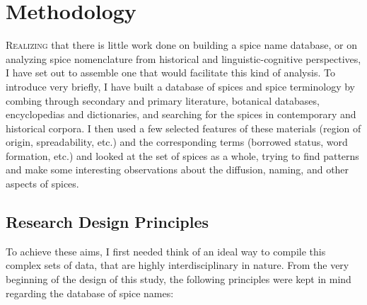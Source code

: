 

\chapter{Methodology}
\label{ch:methodology}


\lettrine[lines=\iniciale]{\textcolor{\accentcolor}{R}}{ealizing} that there is little work done on building a spice name database, or on analyzing spice nomenclature from historical and linguistic-cognitive perspectives, I have set out to assemble one that would facilitate this kind of analysis. 
To introduce very briefly, I have built a database of spices and spice terminology by combing through secondary and primary literature, botanical databases, encyclopedias and dictionaries, and searching for the spices in contemporary and historical corpora. I then used a few selected features of these materials (region of origin, spreadability, etc.) and the corresponding terms (borrowed status, word formation, etc.) and looked at the set of spices as a whole, trying to find patterns and make some interesting observations about the diffusion, naming, and other aspects of spices.


\section{Research Design Principles}

To achieve these aims, I first needed think of an ideal way to compile this complex sets of data, that are highly interdisciplinary in nature. From the very beginning of the design of this study, the following principles were kept in mind regarding the database of spice names: 

